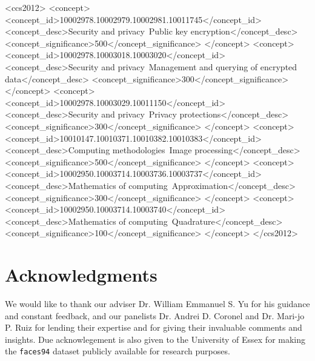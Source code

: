 \documentclass{sig-alternate-05-2015}
\begin{document}
%
%
\begin{CCSXML}
  <ccs2012>
  <concept>
  <concept_id>10002978.10002979.10002981.10011745</concept_id>
  <concept_desc>Security and privacy~Public key encryption</concept_desc>
  <concept_significance>500</concept_significance>
  </concept>
  <concept>
  <concept_id>10002978.10003018.10003020</concept_id>
  <concept_desc>Security and privacy~Management and querying of encrypted data</concept_desc>
  <concept_significance>300</concept_significance>
  </concept>
  <concept>
  <concept_id>10002978.10003029.10011150</concept_id>
  <concept_desc>Security and privacy~Privacy protections</concept_desc>
  <concept_significance>300</concept_significance>
  </concept>
  <concept>
  <concept_id>10010147.10010371.10010382.10010383</concept_id>
  <concept_desc>Computing methodologies~Image processing</concept_desc>
  <concept_significance>500</concept_significance>
  </concept>
  <concept>
  <concept_id>10002950.10003714.10003736.10003737</concept_id>
  <concept_desc>Mathematics of computing~Approximation</concept_desc>
  <concept_significance>300</concept_significance>
  </concept>
  <concept>
  <concept_id>10002950.10003714.10003740</concept_id>
  <concept_desc>Mathematics of computing~Quadrature</concept_desc>
  <concept_significance>100</concept_significance>
  </concept>
  </ccs2012>
\end{CCSXML}


\printccsdesc
{}




\section{Acknowledgments}
We would like to thank our adviser Dr. William Emmanuel S. Yu for his guidance and constant feedback, and our panelists Dr. Andrei D. Coronel and Dr. Mari-jo P. Ruiz for lending their expertise and for giving their invaluable comments and insights.
Due acknowlegement is also given to the University of Essex for making the \texttt{faces94} dataset publicly available for research purposes.


% 

\balancecolumns

\appendix

\balancecolumns
\end{document}
